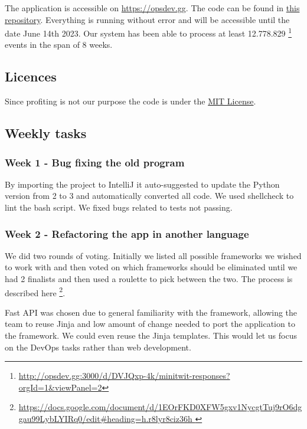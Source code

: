 \documentclass{article}
\begin{document}
The application is accessible on \url{https://opsdev.gg}. The code can be found in \href{https://github.com/MinitwitGroupI/MiniTwit}{this repository}. Everything is running without error and will be accessible until the date June 14th 2023.
Our system has been able to process at least 12.778.829 \footnote{\url{http://opsdev.gg:3000/d/DVJQxp-4k/minitwit-responses?orgId=1&viewPanel=2}} events in the span of 8 weeks.

\subsection{Licences}

Since profiting is not our purpose the code is under the \href{https://github.com/MinitwitGroupI/MiniTwit/blob/main/LICENSE}{MIT License}.

\subsection{Weekly tasks}\label{WeeklyTasksSection}


\subsubsection{Week 1 - Bug fixing the old program}

By importing the project to IntelliJ it auto-suggested to update the Python version from 2 to 3 and automatically converted all code. We used shellcheck to lint the bash script. We fixed bugs related to tests not passing.

\subsubsection{Week 2 - Refactoring the app in another language }

We did two rounds of voting. Initially we listed all possible frameworks we wished to work with and then voted on which frameworks should be eliminated until we had 2 finalists and then used a roulette to pick between the two. The process is described here \footnote{\url{https://docs.google.com/document/d/1EOrFKD0XFW5gxv1NycgtTuj9rO6dggau99LybLYIRq0/edit\#heading=h.r8lyr8ciz36h }}. 

Fast API was chosen due to general familiarity with the framework, allowing the team to reuse Jinja and low amount of change needed to port the application to the framework. We could even reuse the Jinja templates. This would let us focus on the DevOps tasks rather than web development. 
\end{document}
